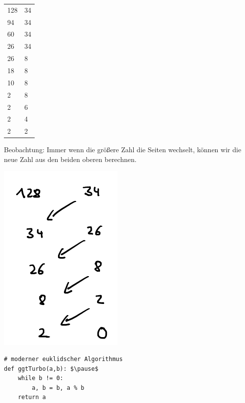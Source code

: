 \documentclass[10pt]{beamer}
\begin{document}
\begin{frame}[fragile]
\begin{minipage}[c]{3cm}      
\begin{tabular}{ll}
128  & 34 \\
94 & 34 \\ 
60  & 34 \\ 
26 & 34 \\ 
26 & 8 \\ 
18 & 8 \\ 
10 & 8 \\ 
2 & 8 \\ 
2 & 6 \\
2 & 4 \\
2 & 2 \\
\end{tabular}
\end{minipage}
\begin{minipage}[c]{7cm}      
Beobachtung: Immer wenn die größere Zahl die Seiten wechselt, können wir die neue Zahl aus den beiden oberen berechnen. \pause

\includegraphics[scale=0.5]{bild2.png} \pause

\begin{lstlisting} 
# moderner euklidscher Algorithmus
def ggtTurbo(a,b): $\pause$
    while b != 0:
        a, b = b, a % b
    return a
\end{lstlisting} 
\end{minipage}

\end{frame}
 
\end{document}
